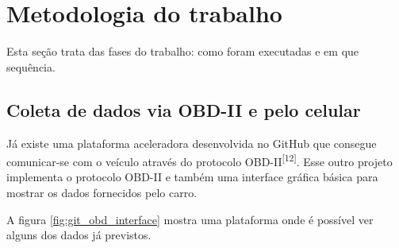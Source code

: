 \chapter{Metodologia do trabalho}
\label{CAP3}

Esta seção trata das fases do trabalho: como foram  executadas e em que sequência.



\section{Coleta de dados via OBD-II e pelo celular}
Já existe uma plataforma aceleradora desenvolvida no GitHub que consegue comunicar-se com o veículo através do protocolo OBD-II\textsuperscript{[12]}. Esse outro projeto implementa o protocolo OBD-II e também uma interface gráfica básica para mostrar os dados fornecidos pelo carro.

A figura \ref{fig:git_obd_interface} mostra uma plataforma onde é possível ver alguns dos dados já previstos.

